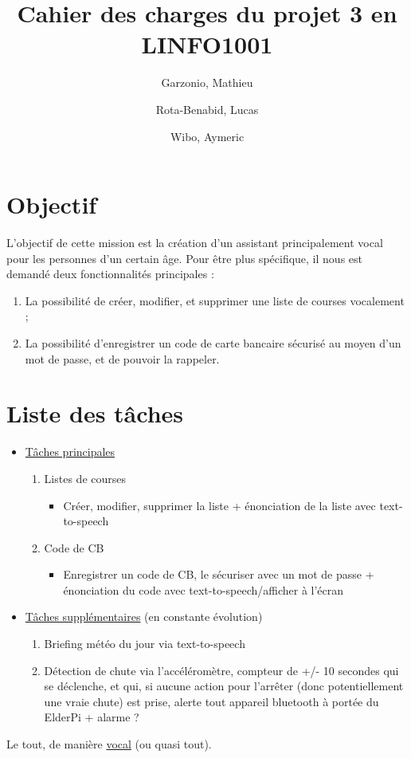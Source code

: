 \documentclass{article}
\title{Cahier des charges du projet 3 en LINFO1001}
\author{
	Garzonio, Mathieu
	\and
	Rota-Benabid, Lucas
	\and
	Wibo, Aymeric
}
\begin{document}
\maketitle

\section{Objectif}

L'objectif de cette mission est la création d'un assistant principalement vocal pour les personnes d'un certain âge. Pour être plus spécifique, il nous est demandé deux fonctionnalités principales :

\begin{enumerate}

	\item{La possibilité de créer, modifier, et supprimer une liste de courses vocalement ;}
	\item{La possibilité d'enregistrer un code de carte bancaire sécurisé au moyen d'un mot de passe, et de pouvoir la rappeler.}

\end{enumerate}

\section{Liste des tâches}

\begin{itemize}
    \item {\underline{Tâches principales}}
    \begin{enumerate}
        \item {Listes de courses}
        \begin{itemize}
            \item {Créer, modifier, supprimer la liste + énonciation de la liste avec text-to-speech}
        \end{itemize}
        \item {Code de CB}
        \begin{itemize}
            \item {Enregistrer un code de CB, le sécuriser avec un mot de passe + énonciation du code avec text-to-speech/afficher à l'écran}
        \end{itemize}
    \end{enumerate}
    \item {\underline{Tâches supplémentaires} (en constante évolution)}
    \begin{enumerate}
        \item Briefing météo du jour via text-to-speech
        \item {Détection de chute via l'accéléromètre, compteur de +/- 10 secondes qui se déclenche, et qui, si aucune action pour l'arrêter (donc potentiellement une vraie chute) est prise, alerte tout appareil bluetooth à portée du ElderPi + alarme ? }
    \end{enumerate}
\end{itemize}
Le tout, de manière \underline{vocal} (ou quasi tout).
\end{document}
